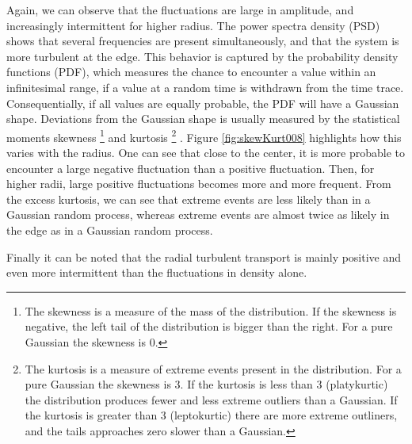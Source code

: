 Again, we can observe that the fluctuations are large in amplitude, and increasingly intermittent for higher radius.
The power spectra density (PSD) shows that several frequencies are present simultaneously, and that the system is more turbulent at the edge.
This behavior is captured by the probability density functions (PDF), which measures the chance to encounter a value within an infinitesimal range, if a value at a random time is withdrawn from the time trace.
Consequentially, if all values are equally probable, the PDF will have a Gaussian shape.
Deviations from the Gaussian shape is usually measured by the statistical moments skewness%
%
\footnote{
    The skewness is a measure of the mass of the distribution.
    If the skewness is negative, the left tail of the distribution is bigger than the right.
    For a pure Gaussian the skewness is 0.
}
%
and kurtosis
%
\footnote{
    The kurtosis is a measure of extreme events present in the distribution.
    For a pure Gaussian the skewness is 3.
    If the kurtosis is less than 3 (platykurtic) the distribution produces fewer and less extreme outliers than a Gaussian.
    If the kurtosis is greater than 3 (leptokurtic) there are more extreme outliners, and the tails approaches zero slower than a Gaussian.
}
%
.
Figure \cref{fig:skewKurt008} highlights how this varies with the radius.
One can see that close to the center, it is more probable to encounter a large negative fluctuation than a positive fluctuation.
Then, for higher radii, large positive fluctuations becomes more and more frequent.
From the excess kurtosis, we can see that extreme events are less likely than in a Gaussian random process, whereas extreme events are almost twice as likely in the edge as in a Gaussian random process.

Finally it can be noted that the radial turbulent transport is mainly positive and even more intermittent than the fluctuations in density alone.

